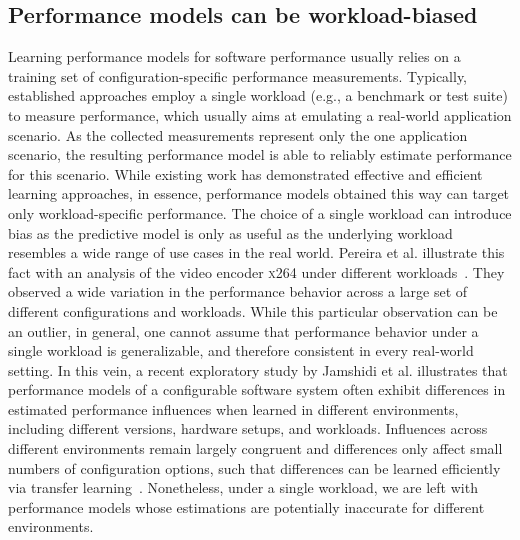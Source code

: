 \subsection*{Performance models can be workload-biased}
Learning performance models for software performance usually relies on a training set of configuration-specific performance measurements. 
Typically, established approaches employ a single workload (e.g., a benchmark or test suite) to measure performance, which usually aims at emulating a real-world application scenario. 
As the collected measurements represent only the one application scenario, the resulting performance model is able to reliably estimate performance for this scenario. 
{\color{Magenta}While existing work has demonstrated effective and efficient learning approaches, in essence, performance models obtained this way can target only workload-specific performance.}
The choice of a single workload can introduce bias as the predictive model is only as useful as the underlying workload resembles a wide range of use cases in the real world. 
Pereira et al. illustrate this fact with an analysis of the video encoder \textsc{x264} under different workloads~\cite{alves_sampling_2020}. 
They observed a wide variation in the performance behavior across a large set of different configurations and workloads. 
While this particular observation can be an outlier, in general, one cannot assume that performance behavior under a single workload is generalizable, and therefore consistent in every real-world setting.
In this vein, a recent exploratory study by Jamshidi et al.\cite{jamishidi_transfer_2017} illustrates that performance models of a configurable software system often exhibit differences in estimated performance influences when learned in different environments, including different versions, hardware setups, and workloads.
Influences across different environments remain largely congruent and differences only affect small numbers of configuration options, such that differences can be learned efficiently via transfer learning~\cite{jamshidi_transfer_gp_2017,jamshidi_learning_2018}. 
Nonetheless, under a single workload, we are left with performance models whose estimations are potentially inaccurate for different environments.

